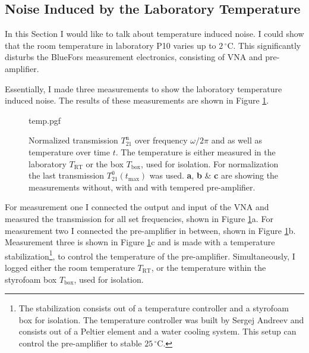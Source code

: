 \subsection{Noise Induced by the Laboratory Temperature} \label{sec:analysis_temp}
In this Section I would like to talk about temperature induced noise. I could show that the room temperature in laboratory P10 varies up to $2\,^\circ$C. This significantly disturbs the BlueFors measurement electronics, consisting of VNA and pre-amplifier.

Essentially, I made three measurements to show the laboratory temperature induced noise. The results of these measurements are shown in Figure \ref{fig:analysis_temp}. 
\begin{figure}
    \centering
    {temp.pgf}
    \caption[Normalized transmission over frequency and as well as temperature over time]{Normalized transmission $T_{21}^\text{n}$ over frequency $\omega/2\pi$ and as well as temperature over time $t$. The temperature is either measured in the laboratory $T_\text{RT}$ or the box $T_\text{box}$, used for isolation. For normalization the last transmission $T_{21}^0(t_\text{max})$ was used. \textbf{\color{antiseeblau100}a}, \textbf{\color{antiseeblau100}b} \& \textbf{\color{antiseeblau100}c} are showing the measurements without, with and with tempered pre-amplifier.}
    \label{fig:analysis_temp}
\end{figure}

For measurement one I connected the output and input of the VNA and measured the transmission for all set frequencies, shown in Figure \ref{fig:analysis_temp}a. For measurement two I connected the pre-amplifier in between, shown in Figure \ref{fig:analysis_temp}b. Measurement three is shown in Figure \ref{fig:analysis_temp}c and is made with a temperature stabilization\footnote{The stabilization consists out of a temperature controller and a styrofoam box for isolation. The temperature controller was built by Sergej Andreev and consists out of a Peltier element and a water cooling system. This setup can control the pre-amplifier to stable $25\,^\circ$C.}, to control the temperature of the pre-amplifier. Simultaneously, I logged either the room temperature $T_\text{RT}$, or the temperature within the styrofoam box $T_\text{box}$, used for isolation. 


